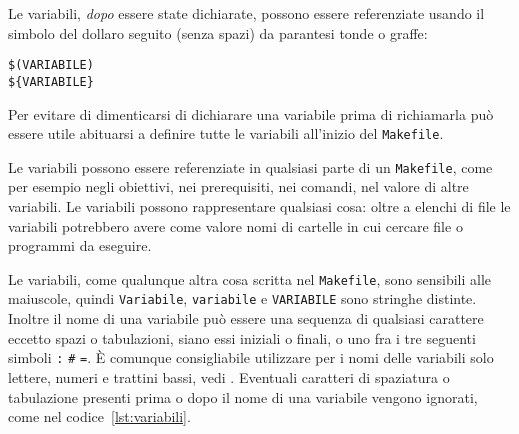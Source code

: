 Le variabili, \emph{dopo} essere state dichiarate, possono essere referenziate
usando il simbolo del dollaro seguito (senza spazi) da parantesi tonde o graffe:
\begin{lstlisting}
$(VARIABILE)
${VARIABILE}
\end{lstlisting}
Per evitare di dimenticarsi di dichiarare una variabile prima di richiamarla può
essere utile abituarsi a definire tutte le variabili all'inizio del
\verb|Makefile|.

Le variabili possono essere referenziate in qualsiasi parte di un
\verb|Makefile|, come per esempio negli obiettivi, nei prerequisiti, nei
comandi, nel valore di altre variabili.  Le variabili possono rappresentare
qualsiasi cosa: oltre a elenchi di file le variabili potrebbero avere come
valore nomi di cartelle in cui cercare file o programmi da eseguire.

Le variabili, come qualunque altra cosa scritta nel \verb|Makefile|, sono
sensibili alle maiuscole, quindi \verb|Variabile|, \verb|variabile| e
\verb|VARIABILE| sono stringhe distinte.  Inoltre il nome di una variabile può
essere una sequenza di qualsiasi carattere eccetto spazi o tabulazioni, siano
essi iniziali o finali, o uno fra i tre seguenti simboli \verb|:| \verb|#|
\verb|=|.  È comunque consigliabile utilizzare per i nomi delle variabili solo
lettere, numeri e trattini bassi, vedi \textcite[57]{gnu:make}.  Eventuali
caratteri di spaziatura o tabulazione presenti prima o dopo il nome di una
variabile vengono ignorati, come nel codice~\ref{lst:variabili}.


